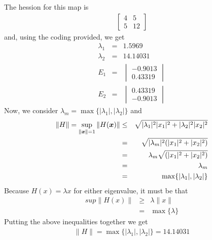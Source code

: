 \documentclass[11pt]{SelfArxOneColBMN}
\begin{document}
\begin{solution}
  The hession for this map is
  \begin{eqnarray*}
    \begin{bmatrix}
      4 & 5\\
      5 & 12
    \end{bmatrix}
  \end{eqnarray*}
  and, using the coding provided, we get
  \begin{eqnarray*}
    \lambda_1 &=& 1.5969\\
    \lambda_2 &=& 14.14031\\
    E_1 &=&
    \begin{vmatrix}
      -0.9013\\
      0.43319
    \end{vmatrix}
    \\
    E_2 &=&
    \begin{vmatrix}
      0.43319\\
      -0.9013
    \end{vmatrix} 
  \end{eqnarray*}
  Now, we consider $\lambda_m = \max\{ |\lambda_1|,|\lambda_2|\}$ and
  \begin{eqnarray*}
    \|H\| = \sup_{\|\boldsymbol{x}\| = 1} \|H(\boldsymbol{x})\| &\leq& \sqrt{|\lambda_1|^2 |x_1|^2 + |\lambda_2|^2 |x_2|^2}\\
    &=& \sqrt{|\lambda_m|^2(|x_1|^2 + |x_2|^2)}\\
    &=& \lambda_m \sqrt{(|x_1|^2 + |x_2|^2)}\\
    &=& \lambda_m\\
    &=& \max\{ |\lambda_1|,|\lambda_2|\}
  \end{eqnarray*}
  Because $H(x) = \lambda x$ for either eigenvalue, it must be that
  \begin{eqnarray*}
    sup\|H(x)\| &\geq& \lambda \|x\|\\
    &=& \max\{\lambda\}
  \end{eqnarray*}
  Putting the above inequalities together we get
  \begin{eqnarray*}
    \|H\|  = \max\{ |\lambda_1|,|\lambda_2|\} = 14.14031
  \end{eqnarray*}
\end{solution}
\end{document}
